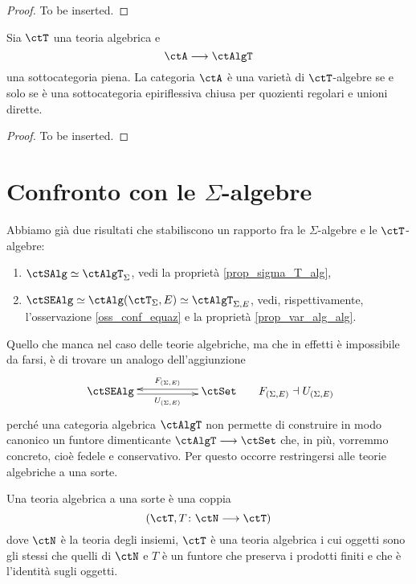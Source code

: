 \begin{proof}
	To be inserted.
\end{proof}

\begin{corollary}\label{cor_th_Birkhoff_AlgT}
	Sia \(\ctT\) una teoria algebrica e
	\[
		\ctA \fun \ctAlgT
	\]
	una sottocategoria piena. La categoria \(\ctA\) è una varietà di \(\ctT\)-algebre se e solo se è una sottocategoria epiriflessiva
	chiusa per quozienti regolari e unioni dirette.
\end{corollary}

\begin{proof}
	To be inserted.
\end{proof}

\section{Confronto con le \(\Sigma\)-algebre}\label{sec_confr_sigma_T}

Abbiamo già due risultati che stabiliscono un rapporto fra le \(\Sigma\)-algebre e le \(\ctT\)-algebre:
\begin{enumerate}
	\item \(\ctSAlg \simeq \ctAlgT_{\Sigma}\), vedi la proprietà \ref{prop_sigma_T_alg},
	\item \(\ctSEAlg \simeq \ctAlg(\ctT_{\Sigma},E) \simeq \ctAlgT_{\Sigma,E}\), vedi, rispettivamente, l'osservazione
	      \ref{oss_conf_equaz} e la proprietà \ref{prop_var_alg_alg}.
\end{enumerate}

Quello che manca nel caso delle teorie algebriche, ma che in effetti è impossibile da farsi, è di trovare un analogo
dell'aggiunzione
$$\xymatrix{\ctSEAlg \ar@<-0.5ex>[rr]_-{U_{(\Sigma,E)}} & & \ctSet \ar@<-0.5ex>[ll]_-{F_{(\Sigma,E)}}}
\;\;\;\;\;\; F_{(\Sigma,E)} \dashv U_{(\Sigma,E)}$$
perché una categoria algebrica $\ctAlgT$ non permette di construire in modo canonico un funtore dimenticante 
$\ctAlgT \fun \ctSet$ che, in più, vorremmo concreto, cioè fedele e conservativo. Per questo occorre restringersi alle 
teorie algebriche a una sorte.

\begin{definition}\label{def_th_alg_unasorte}
	Una teoria algebrica a una sorte è una coppia
	\[
		(\ctT, T \colon \ctN \fun \ctT)
	\]
	dove \(\ctN\) è la teoria degli insiemi, \(\ctT\) è una teoria algebrica i cui oggetti sono gli stessi che quelli di \(\ctN\) e \(T\)
	è un funtore che preserva i prodotti finiti e che è l'identità sugli oggetti.
\end{definition}

